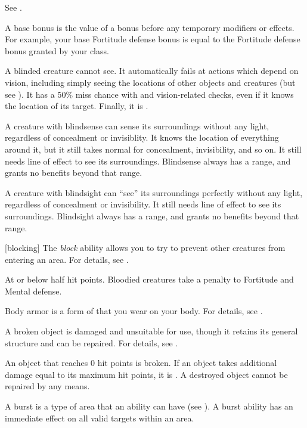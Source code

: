  See .

 A base bonus is the value of a bonus before any temporary modifiers or effects. For example, your base Fortitude defense bonus is equal to the Fortitude defense bonus granted by your class.

 A blinded creature cannot see. It automatically fails at actions which depend on vision, including simply seeing the locations of other objects and creatures (but see ). It has a 50\% miss chance with  and vision-related checks, even if it knows the location of its target. Finally, it is .

 A creature with blindsense can sense its surroundings without any light, regardless of concealment or invisiblity.
It knows the location of everything around it, but it still takes normal  for concealment, invisibility, and so on.
It still needs line of effect to see its surroundings.
Blindsense always has a range, and grants no benefits beyond that range.

 A creature with blindsight can ``see'' its surroundings perfectly without any light, regardless of concealment or invisibility.
It still needs line of effect to see its surroundings.
Blindsight always has a range, and grants no benefits beyond that range.

[blocking] The \textit{block} ability allows you to try to prevent other creatures from entering an area.
For details, see .

 At or below half hit points. Bloodied creatures take a  penalty to Fortitude and Mental defense.

 Body armor is a form of  that you wear on your body.
For details, see .

 A broken object is damaged and unsuitable for use, though it retains its general structure and can be repaired.
For details, see .

An object that reaches 0 hit points is broken. If an object takes additional damage equal to its maximum hit points, it is . A destroyed object cannot be repaired by any means.

 A burst is a type of area that an ability can have (see ).
A burst ability has an immediate effect on all valid targets within an area.

